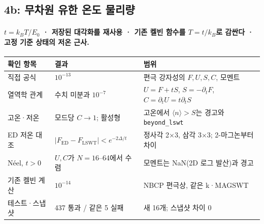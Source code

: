 \subsection{4b: 무차원 유한 온도 물리량}\label{stage4b-thermal}
\begingroup%
  \framesubtitle{$t=k_BT/E_0$ · 저장된 대각화를 재사용 · 기존 켈빈 함수를 $T=t/k_B$로 감싼다 · 고정 기준 상태의 저온 근사.}
  \footnotesize\renewcommand{\arraystretch}{1.08}
  \begin{tabularx}{\textwidth}{@{}P{3.3cm}P{3.4cm}Y@{}}
    \toprule
    확인 항목 & 결과 & 범위 \\
    \midrule
    직접 공식 & $10^{-13}$ & 편극 강자성의 $F,U,S,C$, 모멘트 \\
    열역학 관계 & 수치 미분과 $10^{-7}$ & $U=F+tS$, $S=-\partial_tF$, $C=\partial_tU=t\partial_tS$ \\
    고온·저온 & 모드당 $C\to1$; 활성형 & 고온에서 $\langle n\rangle>S$는 경고와 \texttt{beyond\_lswt} \\
    ED 저온 대조 & $|F_{\mathrm{ED}}-F_{\mathrm{LSWT}}|<e^{-2\Delta/t}$ & 정사각 2$\times$3, 삼각 3$\times$3; 2-마그논부터 차이 \\
    Néel, $t>0$ & $U,C$가 $N=16$--64에서 수렴 & 모멘트는 NaN(2D 로그 발산)과 경고 \\
    기존 켈빈 계산 & $10^{-14}$ & NBCP 편극상, 같은 k·MAGSWT \\
    테스트·스냅샷 & 437 통과 / 같은 5 실패 & 새 16개; 스냅샷 차이 0 \\
    \bottomrule
  \end{tabularx}
  \par\medskip
\endgroup


